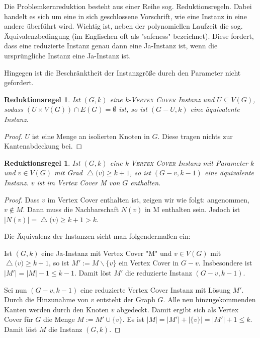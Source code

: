 \documentclass[a4paper,ngerman]{atseminar}
\renewcommand{\deg}[1]{\ensuremath{\operatorname{\triangle}\bigl(#1\bigr)}\xspace}
\newtheorem{reductionrule}[theorem]{\textbf{Reduktionsregel}}
\begin{document}
\begin{example}
    Die Problemkernreduktion besteht aus einer Reihe sog. Reduktionsregeln. Dabei handelt es sich um eine in sich geschlossene
    Vorschrift, wie eine Instanz in eine andere überführt wird.
    Wichtig ist, neben der polynomiellen Laufzeit die sog. Äquivalenzbedingung (im Englischen oft als "safeness" bezeichnet).
    Diese fordert, dass eine reduzierte Instanz genau dann eine Ja-Instanz ist, wenn die ursprüngliche Instanz eine Ja-Instanz ist.

    \noindent
    Hingegen ist die Beschränktheit der Instanzgröße durch den Parameter nicht gefordert.

    \begin{reductionrule}
      \label{OE:reduction:1}
      Ist $(G, k)$ eine k-\textsc{Vertex Cover} Instanz und $U \subseteq V(G)$, sodass $ (U \times V(G)) \cap E(G) = \emptyset $ ist, so ist $(G - U, k)$
      eine äquivalente Instanz.
    \end{reductionrule}
    \begin{proof}
      $U$ ist eine Menge an isolierten Knoten in $G$. Diese tragen nichts zur Kantenabdeckung bei.
    \end{proof}

    \begin{reductionrule}
      \label{OE:reduction:2}
      Ist $(G, k)$ eine k \textsc{Vertex Cover} Instanz mit Parameter $k$ und $v \in V(G)$ mit Grad $\deg{v} \geq k + 1$,
      so ist $(G - v, k - 1)$ eine äquivalente Instanz. $v$ ist im Vertex Cover M von $G$ enthalten.
    \end{reductionrule}
    \begin{proof}
      Dass $v$ im Vertex Cover enthalten ist, zeigen wir wie folgt:
      angenommen, $v \notin M$. Dann muss die Nachbarschaft $N(v)$ in M enthalten sein. Jedoch ist $|N(v)| = \deg{v} \geq k + 1 > k$.


      \noindent
      Die Äquivalenz der Instanzen sieht man folgendermaßen ein:

      \noindent
      Ist $(G, k)$ eine Ja-Instanz mit Vertex Cover "M" und $v \in V(G)$ mit $\deg{v} \geq k + 1$, so ist $M' := M \backslash \{v\}$ ein Vertex Cover in $G - v$.
      Insbesondere ist $|M'| = |M| - 1 \leq k -1$.
      Damit löst $M'$ die reduzierte Instanz $(G - v, k - 1)$.

      \noindent
      Sei nun $(G - v, k - 1)$ eine reduzierte Vertex Cover Instanz mit Lösung $M'$. Durch die Hinzunahme von $v$ entsteht der Graph $G$.
      Alle neu hinzugekommenden Kanten werden durch den Knoten $v$ abgedeckt.
      Damit ergibt sich als Vertex Cover für $G$ die Menge $M := M' \cup \{v\}$.
      Es ist $|M| = |M'| + |\{v\}| = |M'| + 1 \leq k$. Damit löst $M$ die Instanz $(G, k)$.
    \end{proof}


\end{example}
\end{document}
